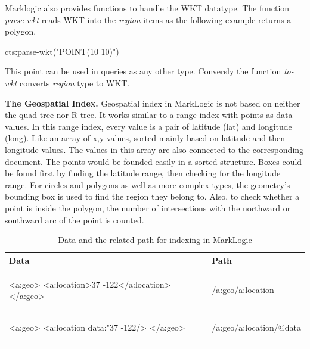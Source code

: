 \documentclass[a4paper,12pt]{article}
\begin{document}
Marklogic also provides functions to handle the WKT datatype. The function \textit{parse-wkt} reads WKT into the \textit{region} items as the following example returns a polygon.
\vspace{10px}
\begin{fakeJSON}
cts:parse-wkt("POINT(10 10)")
\end{fakeJSON}
\vspace{10px}
This point can be used in queries as any other type. Conversly the function \textit{to-wkt} converts \textit{region} type to WKT.


\textbf{The Geospatial Index.}
Geospatial index in MarkLogic is not based on neither the quad tree nor R-tree. It works similar to a range index with points as data values. In this range index, every value is a pair of latitude (lat) and longitude (long). Like an array of x,y values, sorted mainly based on latitude and then longitude values. The values in this array are also connected to the corresponding document.
The points would be founded easily in a sorted structure. 
Boxes could be found first by finding the latitude range, then checking for the longitude range. 
For circles and polygons as well as more complex types, the geometry's bounding box is used to find the region they belong to. 
Also, to check whether a point is inside the polygon, the number of intersections with the northward or southward arc of the point is counted.
\vspace{10px}
\begin{table}
\centering
\begin{tabular}{|l |l |}\hline
\textbf{Data} & \textbf{Path}\\\hline
\begin{fakeJSON}
<a:geo>
  <a:location>37 -122</a:location>
</a:geo>
\end{fakeJSON} &
\begin{fakeJSON}
/a:geo/a:location
\end{fakeJSON}\\\hline
\begin{fakeJSON}
<a:geo>
  <a:location data:"37 -122/>
</a:geo>
\end{fakeJSON} &
\begin{fakeJSON}
/a:geo/a:location/@data
\end{fakeJSON}
\\\hline
\end{tabular}
\caption{Data and the related path for indexing in MarkLogic}
\label{t.pathindexmarklogic}
\end{table}
\end{document}
